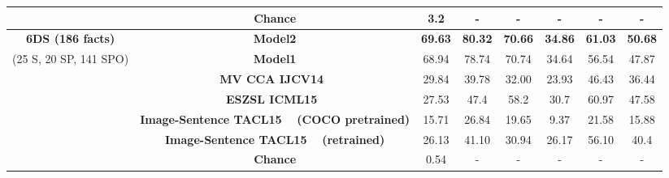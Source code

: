 \documentclass[runningheads]{llncs}
\begin{document}
{\begin{tabular}{|c|c|ccc|ccc|}
                 \textbf{} & \textbf{Chance} & 3.2 & - & - & - & - & - \\
        \hline
 \textbf{6DS (186 facts)}  &   \textbf{Model2} & \textbf{69.63} & \textbf{80.32} & \textbf{70.66} &\textbf{ 34.86} & \textbf{61.03 }& \textbf{50.68 }\\
  (25 S, 20 SP, 141 SPO)  &  \textbf{Model1} &{ 68.94} & {78.74} & 70.74 & 34.64 & 56.54 & 47.87 \\
    &  \textbf{MV CCA IJCV14~\cite{gong2014multi}} & 29.84 & 39.78 & 32.00 & 23.93 & 46.43 & 36.44 \\
  &  \textbf{ESZSL ICML15~\cite{romera2015embarrassingly}} & 27.53 & 47.4 & 58.2 & 30.7 & 60.97  & 47.58 \\
   & \textbf{Image-Sentence TACL15  ~\cite{kiros2014unifying} (COCO pretrained)} & 15.71 & 26.84 & 19.65 & 9.37  & 21.58 & 15.88 \\
      & \textbf{Image-Sentence TACL15  ~\cite{kiros2014unifying} (retrained)} & 26.13 & 41.10 & 30.94 & 26.17  & 56.10 & 40.4  \\
      \textbf{} & \textbf{Chance} &0.54 & - & - & - & - & - \\
\hline
    \end{tabular}
    }
\end{document}
